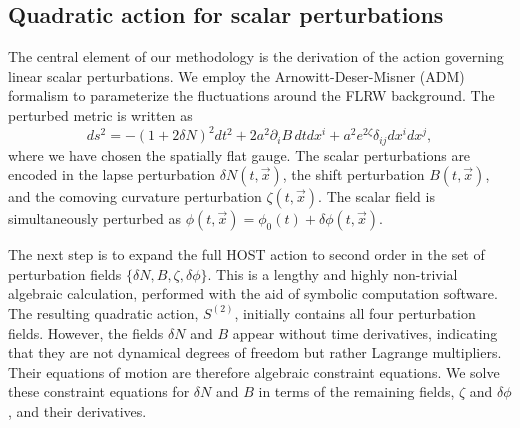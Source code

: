 \documentclass[twocolumn]{aastex631}
\begin{document}
\subsection{Quadratic action for scalar perturbations}
The central element of our methodology is the derivation of the action governing linear scalar perturbations. We employ the Arnowitt-Deser-Misner (ADM) formalism to parameterize the fluctuations around the FLRW background. The perturbed metric is written as
\begin{equation}
ds^2 = -(1+2\delta N)^2 dt^2 + 2 a^2 \partial_i B \, dt dx^i + a^2 e^{2\zeta} \delta_{ij} dx^i dx^j,
\end{equation}
where we have chosen the spatially flat gauge. The scalar perturbations are encoded in the lapse perturbation $\delta N(t, \vec{x})$, the shift perturbation $B(t, \vec{x})$, and the comoving curvature perturbation $\zeta(t, \vec{x})$. The scalar field is simultaneously perturbed as $\phi(t, \vec{x}) = \phi_0(t) + \delta\phi(t, \vec{x})$.

The next step is to expand the full HOST action to second order in the set of perturbation fields $\{\delta N, B, \zeta, \delta\phi\}$. This is a lengthy and highly non-trivial algebraic calculation, performed with the aid of symbolic computation software. The resulting quadratic action, $S^{(2)}$, initially contains all four perturbation fields. However, the fields $\delta N$ and $B$ appear without time derivatives, indicating that they are not dynamical degrees of freedom but rather Lagrange multipliers. Their equations of motion are therefore algebraic constraint equations. We solve these constraint equations for $\delta N$ and $B$ in terms of the remaining fields, $\zeta$ and $\delta\phi$, and their derivatives.
\end{document}
